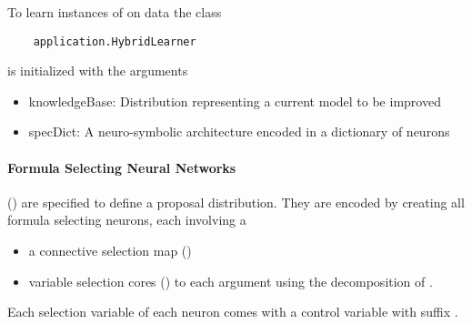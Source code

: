 %


To learn instances of  on data the class
\begin{lstlisting}
	application.HybridLearner
\end{lstlisting}
is initialized with the arguments
\begin{itemize}
    \item knowledgeBase: Distribution representing a current model to be improved
    \item specDict: A neuro-symbolic architecture encoded in a dictionary of neurons
\end{itemize}

\paragraph{Formula Selecting Neural Networks} ()
are specified to define a proposal distribution.
They are encoded by creating all formula selecting neurons, each involving a
\begin{itemize}
    \item a connective selection map ()
    \item variable selection cores () to each argument using the decomposition of .
\end{itemize}
Each selection variable of each neuron comes with a control variable with suffix .

